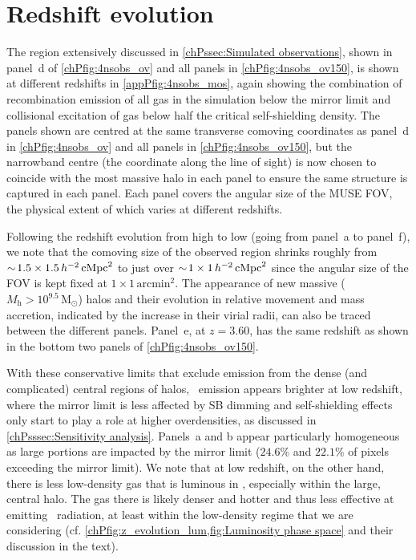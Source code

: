 \section{Redshift evolution}
\label{appPsec:Redshift evolution}

The region extensively discussed in \cref{chPssec:Simulated observations}, shown in panel~d of \cref{chPfig:4nsobs_ov} and all panels in \cref{chPfig:4nsobs_ov150}, is shown at different redshifts in \cref{appPfig:4nsobs_mos}, again showing the combination of recombination emission of all gas in the simulation below the mirror limit and collisional excitation of gas below half the critical self-shielding density. The panels shown are centred at the same transverse comoving coordinates as panel~d in \cref{chPfig:4nsobs_ov} and all panels in \cref{chPfig:4nsobs_ov150}, but the narrowband centre (the coordinate along the line of sight) is now chosen to coincide with the most massive halo in each panel to ensure the same structure is captured in each panel. Each panel covers the angular size of the MUSE FOV, the physical extent of which varies at different redshifts.

Following the redshift evolution from high to low (going from panel~a to panel~f), we note that the comoving size of the observed region shrinks roughly from $\sim \! 1.5 \times 1.5 \, h^{-2} \, \mathrm{cMpc}^2$ to just over $\sim \! 1 \times 1 \, h^{-2} \, \mathrm{cMpc}^2$ since the angular size of the FOV is kept fixed at $1 \times 1 \, \mathrm{arcmin}^2$. The appearance of new massive ($M_\mathrm{h} > 10^{9.5} \, \mathrm{M_\odot}$) halos and their evolution in relative movement and mass accretion, indicated by the increase in their virial radii, can also be traced between the different panels. Panel~e, at $z=3.60$, has the same redshift as shown in the bottom two panels of \cref{chPfig:4nsobs_ov150}.

With these conservative limits that exclude emission from the dense (and complicated) central regions of halos, \lya\ emission appears brighter at low redshift, where the mirror limit is less affected by SB dimming and self-shielding effects only start to play a role at higher overdensities, as discussed in \cref{chPsssec:Sensitivity analysis}. Panels~a and b appear particularly homogeneous as large portions are impacted by the mirror limit ($24.6\%$ and $22.1\%$ of pixels exceeding the mirror limit). We note that at low redshift, on the other hand, there is less low-density gas that is luminous in \lya, especially within the large, central halo. The gas there is likely denser and hotter and thus less effective at emitting \lya\ radiation, at least within the low-density regime that we are considering (cf. \cref{chPfig:z_evolution_lum,fig:Luminosity phase space} and their discussion in the text).